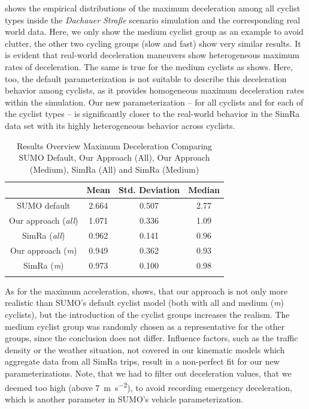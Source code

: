  shows the empirical distributions of the maximum deceleration among all cyclist types inside the \textit{Dachauer} \textit{Straße} scenario simulation and the corresponding real world data.
Here, we only show the medium cyclist group as an example to avoid clutter, the other two cycling groups (slow and fast) show very similar results.
It is evident that real-world deceleration maneuvers show heterogeneous maximum rates of deceleration.
The same is true for the medium cyclists as  shows.
Here, too, the default parameterization is not suitable to describe this deceleration behavior among cyclists, as it provides homogeneous maximum deceleration rates within the simulation.
Our new parameterization -- for all cyclists and for each of the cyclist types -- is significantly closer to the real-world behavior in the SimRa data set with its highly heterogeneous behavior across cyclists.
\begin{table}
\centering
\caption{Results Overview Maximum Deceleration Comparing SUMO Default, Our Approach (All), Our Approach (Medium), SimRa (All) and SimRa (Medium)}%
\label{tab:results_overview_dec}
\begin{tabular}{cccc}
\toprule
& Mean & Std. Deviation & Median\\
\midrule
\midrule
SUMO default & \num{2.664} & \num{0.507} & \num{2.77} \\
\midrule
Our approach (\textit{all}) & \num{1.071} & \num{0.336} & \num{1.09} \\
SimRa (\textit{all}) & \num{0.962} & \num{0.141} & \num{0.96} \\
\midrule
Our approach (\textit{m}) & \num{0.949} & \num{0.362} & \num{0.93} \\
SimRa (\textit{m}) & \num{0.973} & \num{0.100} & \num{0.98} \\
\bottomrule&
\end{tabular}
\end{table}
As for the maximum acceleration,  shows, that our approach is not only more realistic than SUMO's default cyclist model (both with all and medium (\textit{m}) cyclists), but the introduction of the cyclist groups increases the realism.
The medium cyclist group was randomly chosen as a representative for the other groups, since the conclusion does not differ.
Influence factors, such as the traffic density or the weather situation, not covered in our kinematic models which aggregate data from all SimRa trips, result in a non-perfect fit for our new parameterizations.
Note, that we had to filter out deceleration values, that we deemed too high (above \SI{7}{\m\per\s\squared}), to avoid recording emergency deceleration, which is another parameter in SUMO's vehicle parameterization.

